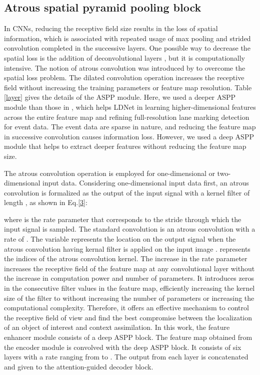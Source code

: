\documentclass[journal]{IEEEtran}
\begin{document}
\subsection{Atrous spatial pyramid pooling block}
In CNNs, reducing the receptive field size results in the loss of spatial information, which is associated with repeated usage of max pooling and strided convolution completed in the successive layers. One possible way to decrease the spatial loss is the addition of deconvolutional layers \cite{Long2015} \cite{a2}, but it is computationally intensive. The notion of atrous convolution was introduced by \cite{a3} \cite{a4} to overcome the spatial loss problem. The dilated convolution operation increases the receptive field without increasing the training parameters or feature map resolution. 
Table \ref{layer} gives the details of the ASPP module. Here, we used a deeper ASPP module than those in \cite{a3} \cite{a4}, which helps LDNet in learning higher-dimensional features across the entire feature map and refining full-resolution lane marking detection for event data. The event data are sparse in nature, and reducing the feature map in successive convolution causes information loss. However, we used a deep ASPP module that helps to extract deeper features without reducing the feature map size.
\par
The atrous convolution operation is employed for one-dimensional or two-dimensional input data. Considering one-dimensional input data first, an atrous convolution is formalized as the output  of the input signal  with a kernel filter  of length , as shown in Eq.\ref{3}:

where  is the rate parameter that corresponds to the stride through which the input signal is sampled. The standard convolution is an atrous convolution with a rate of . The variable  represents the location on the output signal  when the atrous convolution having kernal filter  is applied on the input image .  represents the indices of the atrous convolution kernel. The increase in the rate parameter increases the receptive field of the feature map at any convolutional layer without the increase in computation power and number of parameters. It introduces  zeros in the consecutive filter values in the feature map, efficiently increasing the kernel size of the  filter to  without increasing the number of parameters or increasing the computational complexity. Therefore, it offers an effective mechanism to control the receptive field of view and find the best compromise between the localization of an object of interest and context assimilation. In this work, the feature enhancer module consists of a deep ASPP block. The feature map obtained from the encoder module is convolved with the deep ASPP block. It consists of six layers with a rate ranging from  to . The output from each layer is concatenated and given to the attention-guided decoder block.
\end{document}
